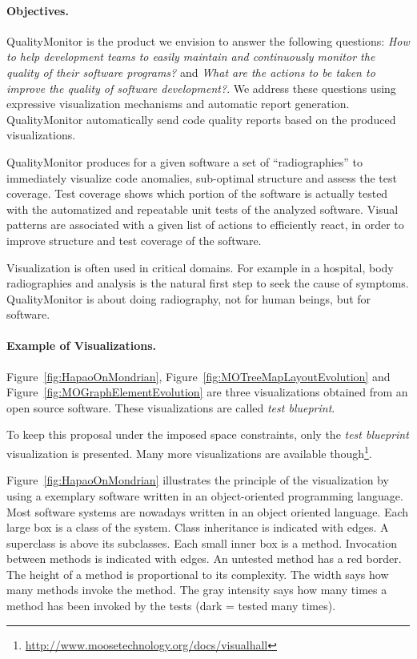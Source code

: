 \documentclass[runningheads]{llncs}
\newcommand{\figref}[1]{Figure~\ref{fig:#1}}
\begin{document}
\paragraph{Objectives.}
QualityMonitor is the product we envision to answer the following questions: \emph{How to help development teams to easily maintain and continuously monitor the quality of their software programs?} and \emph{What are the actions to be taken to improve the quality of software development?}. We address these questions using expressive visualization mechanisms and automatic report generation. QualityMonitor automatically send code quality reports based on the produced visualizations.

QualityMonitor produces for a given software a set of  ``radiographies'' to immediately visualize code anomalies, sub-optimal structure and assess the test coverage. Test coverage shows which portion of the software is actually tested with the automatized and repeatable unit tests of the analyzed software. Visual patterns are associated with a given list of actions to efficiently react, in order to improve structure and test coverage of the software. 

Visualization is often used in critical domains. For example in a hospital, body radiographies and analysis is the natural first step to seek the cause of symptoms. QualityMonitor is about doing radiography, not for human beings, but for software.

\paragraph{Example of Visualizations.}
\figref{HapaoOnMondrian}, \figref{MOTreeMapLayoutEvolution} and \figref{MOGraphElementEvolution} are three visualizations obtained from an open source software. These visualizations are called \emph{test blueprint}.

To keep this proposal under the imposed space constraints, only the \emph{test blueprint} visualization is presented. Many more visualizations are available though\footnote{\url{http://www.moosetechnology.org/docs/visualhall}}.

\figref{HapaoOnMondrian} illustrates the principle of the visualization by using a exemplary software written in an object-oriented programming language. Most software systems are nowadays written in an object oriented language. Each large box is a class of the system. Class inheritance is indicated with edges. A superclass is above its subclasses. Each small inner box is a method. Invocation between methods is indicated with edges. An untested method has a red border. The height of a method is proportional to its complexity. The width says how many methods invoke the method. The gray intensity says how many times a method has been invoked by the tests (dark = tested many times).
\end{document}
